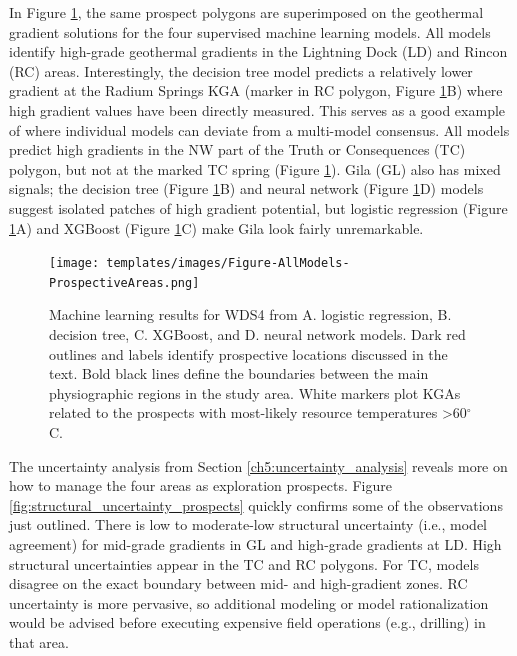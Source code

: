 In Figure \ref{fig:ml_models_prospects}, the same prospect polygons are superimposed on the geothermal gradient solutions for the four supervised machine learning models. All models identify high-grade geothermal gradients in the Lightning Dock (LD) and Rincon (RC) areas. Interestingly, the decision tree model predicts a relatively lower gradient at the Radium Springs KGA (marker in RC polygon, Figure \ref{fig:ml_models_prospects}B) where high gradient values have been  directly measured. This serves as a good example of where individual models can deviate from a multi-model consensus. All models predict high gradients in the NW part of the Truth or Consequences (TC) polygon, but not at the marked TC spring (Figure \ref{fig:ml_models_prospects}). Gila (GL) also has mixed signals; the decision tree (Figure \ref{fig:ml_models_prospects}B) and neural network (Figure \ref{fig:ml_models_prospects}D) models suggest isolated patches of high gradient potential, but logistic regression (Figure \ref{fig:ml_models_prospects}A) and XGBoost (Figure \ref{fig:ml_models_prospects}C) make Gila look fairly unremarkable.

\begin{figure}
\centering
\texttt{[image: templates/images/Figure-AllModels-ProspectiveAreas.png]}
\caption[Machine learning models with prospective areas]
{Machine learning results for WDS4 from A. logistic regression, B. decision tree, C. XGBoost, and D. neural network models. Dark red outlines and labels identify prospective locations discussed in the text. Bold black lines define the boundaries between the main physiographic regions in the study area. White markers plot KGAs related to the prospects with most-likely resource temperatures >60$^\circ$C.}
\label{fig:ml_models_prospects}
\end{figure}

The uncertainty analysis from Section \ref{ch5:uncertainty_analysis} reveals more on how to manage the four areas as exploration prospects. Figure \ref{fig:structural_uncertainty_prospects} quickly confirms some of the observations just outlined. There is low to moderate-low structural uncertainty (i.e., model agreement) for mid-grade gradients in GL and high-grade gradients at LD. High structural uncertainties appear in the TC and RC polygons. For TC, models disagree on the exact boundary between mid- and high-gradient zones. RC uncertainty is more pervasive, so additional modeling or model rationalization would be advised before executing expensive field operations (e.g., drilling) in that area.

